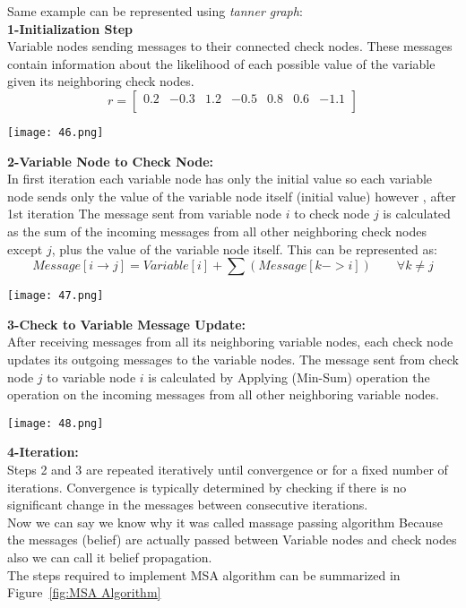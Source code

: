 Same example can be represented using \emph{tanner graph}:\\
\textbf{1-Initialization Step}\\
Variable nodes sending messages to their connected check nodes. These messages contain information about the likelihood of each possible value of the variable given its neighboring check nodes.
\[ r=[\begin{matrix}0.2&-0.3&1.2&-0.5&0.8&0.6&-1.1\\\end{matrix}] \]
\begin{figure*}[ht]
    \centering
    \texttt{[image: 46.png]}
\end{figure*}

\textbf{2-Variable Node to Check Node:}\\
In first iteration each variable node has only the initial value so each variable node sends only the value of the variable node itself (initial value) however , after 1st iteration The message sent from variable node $i$ to check node $j$ is calculated as the sum of the incoming messages from all other neighboring check nodes except $j$, plus the value of the variable node itself. This can be represented as:
\[Message[i \rightarrow j] = Variable[i] + \sum(Message[k -> i]) \qquad \forall k \neq j \]
\begin{figure*}[ht]
    \centering
    \texttt{[image: 47.png]}
\end{figure*}

\textbf{3-Check to Variable Message Update:}\\
After receiving messages from all its neighboring variable nodes, each check node updates its outgoing messages to the variable nodes. The message sent from check node $j$ to variable node $i$ is calculated by Applying (Min-Sum) operation the operation on the incoming messages from all other neighboring variable nodes.
\begin{figure*}[ht]
    \centering
    \texttt{[image: 48.png]}
\end{figure*}

\textbf{4-Iteration:}\\ 
Steps 2 and 3 are repeated iteratively until convergence or for a fixed number of iterations. Convergence is typically determined by checking if there is no significant change in the messages between consecutive iterations.\\
Now we can say we know why it was called massage passing algorithm Because the messages (belief) are actually passed between Variable nodes and check nodes also we can call it belief propagation.\\
The steps required to implement MSA algorithm can be summarized in Figure~\ref{fig:MSA Algorithm}

